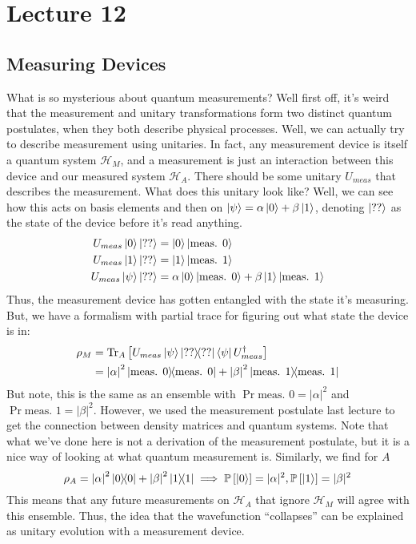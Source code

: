 \section{Lecture 12}

\subsection{Measuring Devices}
What is so mysterious about quantum measurements? Well first off, it's weird that the measurement and unitary transformations
form two distinct quantum postulates, when they both describe physical processes. Well, we can actually try to describe measurement using unitaries.
In fact, any measurement device is itself a quantum system $\mathcal{H}_M$, and a measurement is just an interaction between this device
and our measured system $\mathcal{H}_A$. There should be some unitary $U_{meas}$ that describes the measurement.
What does this unitary look like? Well, we can see how this acts on basis elements and then on $\ket{\psi} = \alpha \ket{0} + \beta \ket{1}$,
denoting $\ket{??}$ as the state of the device before it's read anything.
\begin{align*}
    U_{meas} \ket{0} \ket{??} &= \ket{0} \ket{\text{meas. } 0} \\
    U_{meas} \ket{1} \ket{??} &= \ket{1} \ket{\text{meas. } 1} \\
    U_{meas} \ket{\psi} \ket{??} &= \alpha \ket{0} \ket{\text{meas. } 0} + \beta  \ket{1} \ket{\text{meas. } 1}
\end{align*}
Thus, the measurement device has gotten entangled with the state it's measuring. But,
we have a formalism with partial trace for figuring out what state the device is in:
\begin{align*}
    \rho_M &= \Tr_A \qty[U_{meas} \ket{\psi} \ketbra{??} \bra{\psi} U_{meas}^{\dagger}] \\
    &=\qty|\alpha|^2 \ketbra{\text{meas. } 0} + \qty|\beta|^2 \ketbra{\text{meas. } 1}
\end{align*}
But note, this is the same as an ensemble with $\Pr{\text{meas. } 0} = |\alpha|^2$ and $\Pr{\text{meas. } 1} = |\beta|^2$. However,
we used the measurement postulate last lecture to get the connection between density matrices and quantum systems.
Note that what we've done here is not a derivation of the measurement postulate, but it is a nice way of looking at what quantum measurement is. Similarly,
we find for $A$
\[ \rho_A = \qty|\alpha|^2 \ketbra{0} + \qty|\beta|^2 \ketbra{1} \implies \mathbb{P}\left[ \ket{0} \right] = |\alpha|^2, \mathbb{P}\left[ \ket{1} \right] = |\beta|^2 \]
This means that any future measurements on $\mathcal{H}_A$ that ignore $\mathcal{H}_M$ will agree with this ensemble. Thus, the idea
that the wavefunction ``collapses'' can be explained as unitary evolution with a measurement device.

